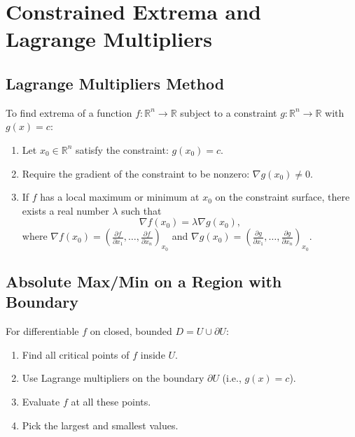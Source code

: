 \documentclass{article}
\begin{document}
\section{Constrained Extrema and Lagrange Multipliers}
\subsection{Lagrange Multipliers Method}  
To find extrema of a function $f:\mathbb{R}^n \to \mathbb{R}$ subject to a constraint $g:\mathbb{R}^n \to \mathbb{R}$ with $g(x) = c$:  
\begin{enumerate}
    \item Let $x_0 \in \mathbb{R}^n$ satisfy the constraint: $g(x_0) = c$.
    \item Require the gradient of the constraint to be nonzero: $\nabla g(x_0) \neq 0$.
    \item If $f$ has a local maximum or minimum at $x_0$ on the constraint surface, there exists a real number $\lambda$ such that
    \[
    \nabla f(x_0) = \lambda \nabla g(x_0),
    \]
    where $\nabla f(x_0) = \left(\frac{\partial f}{\partial x_1}, \dots, \frac{\partial f}{\partial x_n}\right)_{x_0}$ and $\nabla g(x_0) = \left(\frac{\partial g}{\partial x_1}, \dots, \frac{\partial g}{\partial x_n}\right)_{x_0}$.
\end{enumerate}

\subsection{Absolute Max/Min on a Region with Boundary}  
For differentiable $f$ on closed, bounded $D = U \cup \partial U$:  
\begin{enumerate}
    \item Find all critical points of $f$ inside $U$.
    \item Use Lagrange multipliers on the boundary $\partial U$ (i.e., $g(x) = c$).
    \item Evaluate $f$ at all these points.
    \item Pick the largest and smallest values.
\end{enumerate}
\end{document}
